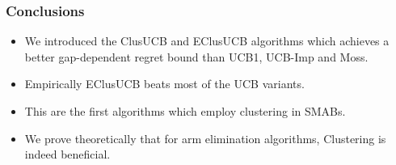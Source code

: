 \begin{frame}
\frametitle{Conclusions}
\begin{itemize}
\item<1-> We introduced the ClusUCB and EClusUCB algorithms which achieves a better gap-dependent regret bound than UCB1, UCB-Imp and Moss.
\item<2-> Empirically EClusUCB beats most of the UCB variants.
\item<3-> This are the first algorithms which employ clustering in SMABs.
\item<4-> We prove theoretically that for arm elimination algorithms, Clustering is indeed beneficial.
\end{itemize}
\end{frame}